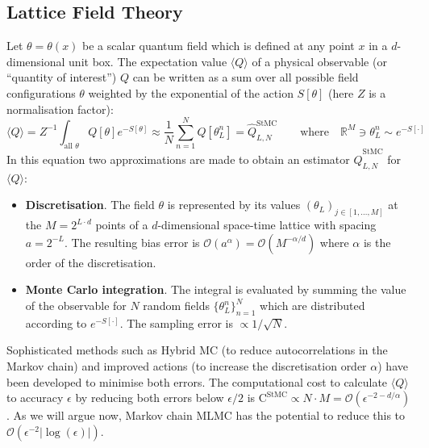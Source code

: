 \documentclass[11pt]{article}
\begin{document}
\subsection{Lattice Field Theory}
Let $\theta=\theta(x)$ be a scalar quantum field which is defined at any point $x$ in a $d$-dimensional unit box. The expectation value $\langle Q\rangle$ of a physical observable (or ``quantity of interest'') $Q$ can be written as a sum over all possible field configurations $\theta$ weighted by the exponential of the action $S[\theta]$ (here $Z$ is a normalisation factor):
\begin{equation}
  \langle Q\rangle = Z^{-1} \int_{\text{all $\theta$}} Q[\theta]e^{-S[\theta]} \approx \frac{1}{N} \sum_{n=1}^N Q[\theta_L^n] = \hat{Q}^{\text{StMC}}_{L,N} \qquad\text{where}\quad \mathbb{R}^{M}\ni \theta_L^n\sim e^{-S[\cdot]}\label{eqn:StMCestimator}
\end{equation}
In this equation two approximations are made to obtain an estimator $\hat{Q}^{\text{StMC}}_{L,N}$ for $\langle Q\rangle$:
\begin{itemize}
\item \textbf{Discretisation}. The field $\theta$ is represented by its values $(\theta_L)_{j\in [1,\dots,M]}$ at the $M=2^{L\cdot d}$ points of a $d$-dimensional space-time lattice with spacing $a=2^{-L}$. The resulting bias error is $\mathcal{O}(a^\alpha)=\mathcal{O}(M^{-\alpha/d})$ where $\alpha$ is the order of the discretisation.
    \item \textbf{Monte Carlo integration}. The integral is evaluated by summing the value of the observable for $N$ random fields $\{\theta_L^n\}_{n=1}^N$ which are distributed according to $e^{-S[\cdot ]}$. The sampling error is $\propto{1/\sqrt{N}}$.
\end{itemize}
Sophisticated methods such as Hybrid MC \cite{Duane1987} (to reduce autocorrelations in the Markov chain) and improved actions \cite{Lepage1994} (to increase the discretisation order $\alpha$) have been developed to minimise both errors.
The computational cost to calculate $\langle Q\rangle$ to accuracy $\epsilon$ by reducing both errors below $\epsilon/2$ is $\text{C}^{\text{StMC}}\propto N\cdot M=\mathcal{O}(\epsilon^{-2-d/\alpha})$. As we will argue now, Markov chain MLMC \cite{Dodwell2015} has the potential to reduce this to $\mathcal{O}(\epsilon^{-2}|\log(\epsilon)|)$.
\end{document}
